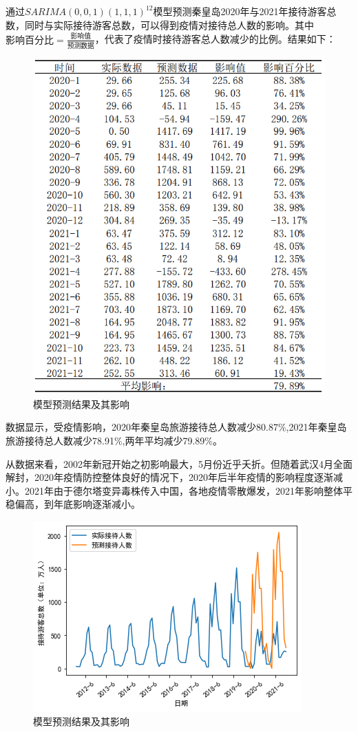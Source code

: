 通过$SARIMA(0,0,1)(1,1,1)^{12}$模型预测秦皇岛2020年与2021年接待游客总数，同时与实际接待游客总数，可以得到疫情对接待总人数的影响。其中$\text{影响百分比}=\frac{\text{影响值}}{\text{预测数据}}$，代表了疫情时接待游客总人数减少的比例。结果如下：
		\begin{figure}[htbp]
		\centering
		\includegraphics[scale=0.55,angle=0]{images/15.png}
		\caption{模型预测结果及其影响}
		\label{15}
	\end{figure}
	
	数据显示，受疫情影响，2020年秦皇岛旅游接待总人数减少80.87\%,2021年秦皇岛旅游接待总人数减少78.91\%,两年平均减少79.89\%。
	
	从数据来看，2002年新冠开始之初影响最大，5月份近乎夭折。但随着武汉4月全面解封，2020年疫情防控整体良好的情况下，2020年后半年疫情的影响程度逐渐减小。2021年由于德尔塔变异毒株传入中国，各地疫情零散爆发，2021年影响整体平稳偏高，到年底影响逐渐减小。
			\begin{figure}[H]
		\centering
		\includegraphics[scale=0.55,angle=0]{images/13.png}
		\caption{模型预测结果及其影响}
		\label{13}
	\end{figure}

